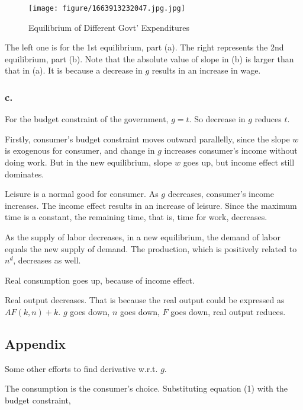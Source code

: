 \documentclass{article}
\begin{document}
\begin{figure}[H]
    \begin{center}
        \texttt{[image: figure/1663913232047.jpg.jpg]}
    \end{center}
    \caption{Equilibrium of Different Govt' Expenditures}
    \label{fig:graph}
\end{figure}

The left one is for the 1st equilibrium, part (a). The right represents the 2nd equilibrium, part (b). Note that the absolute value of slope in (b) is larger than that in (a). It is because a decrease in $g$ results in an increase in wage. 

\subsubsection*{\textrm{c.}}

For the budget constraint of the government, $g=t$. So decrease in $g$ reduces $t$. 

Firstly, consumer's budget constraint moves outward parallelly, since the slope $w$ is exogenous for consumer, and change in $g$ increases consumer's income without doing work. But in the new equilibrium, slope $w$ goes up, but income effect still dominates.

Leisure is a normal good for consumer. As $g$ decreases, consumer's income increases. The income effect results in an increase of leisure. Since the maximum time is a constant, the remaining time, that is, time for work, decreases.

As the supply of labor decreases, in a new equilibrium, the demand of labor equals the new supply of demand. The production, which is positively related to $n^{d}$, decreases as well.

Real consumption goes up, because of income effect.

Real output decreases. That is because the real output could be expressed as $AF(k,n)+k$. $g$ goes down, $n$ goes down, $F$ goes down, real output reduces. 

\subsection*{\textbf{Appendix}}

Some other efforts to find derivative w.r.t. $g$.

The consumption is the consumer's choice. Substituting equation (1) with the budget constraint,
\end{document}
